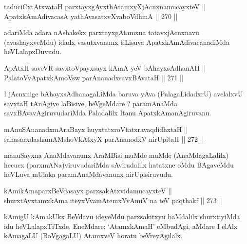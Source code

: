 \begin{shl}
taduciCxtAtxvataH parxtayxgAyxthAtamxyXjAcnxnamucayxteV || \\
ApatxkAmAdivacasA yathAvasatxvXvaboVdhinA \hfill || 270 ||  
\end{shl}

\begin{artha}
adariMda adara nAshakekx parxtayxgAtamxna tatavxjAcnxnavu
(avashayxveMdu) idadx vasutxvanunx tiLisuva ApatxkAmAdivacanadiMda heVLalapxDuvudu.
\end{artha}


\begin{shl}
ApAtxH saveVR savxtoV\s payxsayx kAmA yeV bAhayxsAdhanAH || \\
PalatoV\s vApatxkAmoV\s sw parAnanadxsavxBAvataH \hfill || 271 ||  
\end{shl}

\begin{artha}
I jAcnxnige bAhayxsAdhanagaLiMda baruva yAva (PalagaLidadxrU)
avelalxvU savxtaH tAnAgiye laBisive, heVgeMdare  ? paramAnaMda
savxBAvavAgiruvudariMda Paladalilx Itanu ApatxkAmanAgiruvanu.
\end{artha}


\begin{shl}
mAnuSAnanadxmAraBayx huyxtatxroVtatxravaqdidhxtaH || \\
sahasarxdashamAMshoVkAtxyX parAnanodxV nirUpitaH \hfill || 272 ||  
\end{shl}

\begin{artha}
manuSayxna AnaMdavanunx AraMBisi muMde muMde (AnaMdagaLalilx) hecucx
(parxmANa)viruvudariMda sAviradalilx hatatxne oMdu BAgaveMdu heVLuva
mUlaka paramAnaMdavanunx nirUpisiruvudu.
\end{artha}


\begin{shl}
kAmikAmaparxBeVdasayx parxsakAtxvidamucayxteV || \\
shurxtAyx\s \s tamxkAma iteyxVvamAtemxYvAmiV na teV paqthakf \hfill || 273 ||  
\end{shl}

\begin{artha}
kAmigU kAmakUkx BeVdavu ideyeMdu parxsakitxyu baMdalilx shurxtiyiMda
idu heVLalapxTiTxde, EneMdare; `AtamxkAmaH' eMbudAgi, aMdare I elAlx
kAmagaLU (BoVgagaLU) AtamxveV horatu beVreyAgilalx.
\end{artha}

